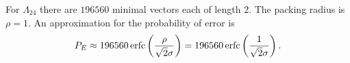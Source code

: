 \documentclass[draftcls, onecolumn, 11pt]{IEEEtran}
\begin{document}
For $\Lambda_{24}$ there are $196560$ minimal vectors each of length $2$.  The packing radius is $\rho = 1$.  An approximation for the probability of error is
\[
P_E \approx 196560\operatorname{erfc}\left( \frac{\rho}{\sqrt{2}\sigma} \right) = 196560\operatorname{erfc}\left(\frac{1}{\sqrt{2}\sigma}\right).
\]



\end{document}
